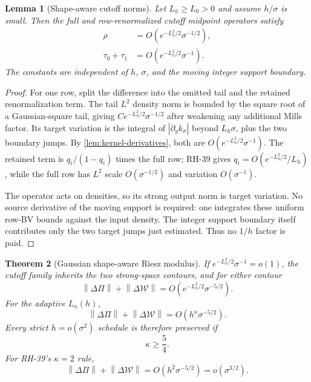\documentclass[11pt]{article}
\newtheorem{theorem}{Theorem}[section]
\newtheorem{lemma}[theorem]{Lemma}
\theoremstyle{remark}
\newcommand{\cW}{\mathcal W}
\newcommand{\norm}[1]{\left\lVert #1\right\rVert}
\begin{document}
\begin{lemma}[Shape-aware cutoff norms]
\label{lem:shape-cutoff}
Let $L_h\ge L_0>0$ and assume $h/\sigma$ is small.  Then the full and
row-renormalized cutoff midpoint operators satisfy
\begin{align}
 \rho&=O(e^{-L_h^2/2}\sigma^{-1/2}),
 \label{eq:shape-rho}\\
 \tau_0+\tau_1&=O(e^{-L_h^2/2}\sigma^{-1}).
 \label{eq:shape-tau}
\end{align}
The constants are independent of $h$, $\sigma$, and the moving integer
support boundary.
\end{lemma}

\begin{proof}
For one row, split the difference into the omitted tail and the retained
renormalization term.  The tail $L^2$ density norm is bounded by the square
root of a Gaussian-square tail, giving
$Ce^{-L_h^2/2}\sigma^{-1/2}$ after weakening any additional Mills factor.
Its target variation is the integral of $|\partial_yk_\sigma|$ beyond
$L_h\sigma$, plus the two boundary jumps.  By
\cref{lem:kernel-derivatives}, both are
$O(e^{-L_h^2/2}\sigma^{-1})$.  The retained term is $q_i/(1-q_i)$ times the
full row; RH-39 gives $q_i=O(e^{-L_h^2/2}/L_h)$, while the full row has
$L^2$ scale $O(\sigma^{-1/2})$ and variation $O(\sigma^{-1})$.

The operator acts on densities, so its strong output norm is target
variation.  No source derivative of the moving support is required: one
integrates these uniform row-BV bounds against the input density.  The
integer support boundary itself contributes only the two target jumps just
estimated.  Thus no $1/h$ factor is paid.
\end{proof}

\begin{theorem}[Gaussian shape-aware Riesz modulus]
\label{thm:shape-riesz}
If $e^{-L_h^2/2}\sigma^{-1}=o(1)$, the cutoff family inherits the two
strong-space contours, and for either contour
\begin{equation}
 \boxed{
 \norm{\Delta\Pi}+\norm{\Delta\cW}
 =O(e^{-L_h^2/2}\sigma^{-5/2}).}
 \label{eq:shape-riesz}
\end{equation}
For the adaptive $L_\kappa(h)$,
\begin{equation}
 \norm{\Delta\Pi}+\norm{\Delta\cW}
 =O(h^\kappa\sigma^{-5/2}).
 \label{eq:shape-adaptive}
\end{equation}
Every strict $h=o(\sigma^2)$ schedule is therefore preserved if
\begin{equation}
 \boxed{\kappa\ge\frac54.}
 \label{eq:shape-threshold}
\end{equation}
For RH-39's $\kappa=2$ rule,
\begin{equation}
 \norm{\Delta\Pi}+\norm{\Delta\cW}
 =O(h^2\sigma^{-5/2})=o(\sigma^{3/2}).
 \label{eq:kappa-two-sharp}
\end{equation}
\end{theorem}
\end{document}
